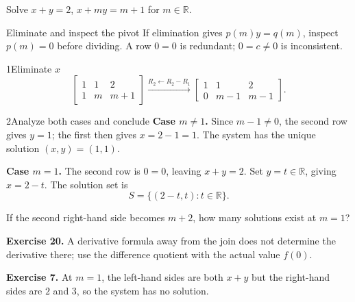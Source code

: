 \documentclass[12pt,a4paper]{article}
\begin{document}
Solve $x+y=2$, $x+my=m+1$ for $m\in\mathbb R$.
\begin{FormulaBox}{Eliminate and inspect the pivot}
If elimination gives $p(m)y=q(m)$, inspect $p(m)=0$ before dividing. A row $0=0$ is redundant; $0=c\ne0$ is inconsistent.
\end{FormulaBox}
\begin{StepBox}{1}{Eliminate $x$}
\[
\left[\begin{array}{cc|c}1&1&2\\1&m&m+1\end{array}\right]
\xrightarrow{R_2\leftarrow R_2-R_1}
\left[\begin{array}{cc|c}1&1&2\\0&m-1&m-1\end{array}\right].
\]
\end{StepBox}
\begin{StepBox}{2}{Analyze both cases and conclude}
\textbf{Case $m\ne1$.} Since $m-1\ne0$, the second row gives $y=1$; the first then gives $x=2-1=1$. The system has the unique solution $(x,y)=(1,1)$.

\textbf{Case $m=1$.} The second row is $0=0$, leaving $x+y=2$. Set $y=t\in\mathbb R$, giving $x=2-t$. The solution set is
\[
\boxed{S=\{(2-t,t):t\in\mathbb R\}}.
\]
\end{StepBox}
\begin{SelfCheckBox}
If the second right-hand side becomes $m+2$, how many solutions exist at $m=1$?
\end{SelfCheckBox}
\BackToContents

\textbf{Exercise 20.} A derivative formula away from the join does not determine the derivative there; use the difference quotient with the actual value $f(0)$.

\textbf{Exercise 7.} At $m=1$, the left-hand sides are both $x+y$ but the right-hand sides are $2$ and $3$, so the system has no solution.
\BackToContents
\end{document}
